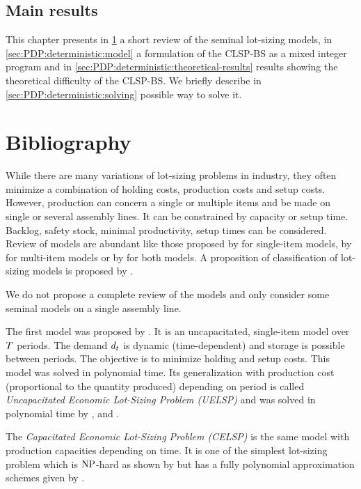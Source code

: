 \subsection{Main results}
\label{sec:PDP:deterministic:introduction:main-results}


This chapter presents in \cref{sec:PDP:deterministic:bibliography} a short review of the seminal lot-sizing models, in \cref{sec:PDP:deterministic:model} a formulation of the CLSP-BS as a mixed integer program and in \cref{sec:PDP:deterministic:theoretical-results} results showing the theoretical difficulty of the CLSP-BS.
We briefly describe in \cref{sec:PDP:deterministic:solving} possible way to solve it.



\section{Bibliography}
\label{sec:PDP:deterministic:bibliography}

While there are many variations of lot-sizing problems in industry, they often minimize a combination of holding costs, production costs and setup costs.
However, production can concern a single or multiple items and be made on single or several assembly lines.
It can be constrained by capacity or setup time.
Backlog, safety stock, minimal productivity, setup times can be considered.
Review of models are abundant like those proposed by \citet{Geunes2014} for single-item models, by \citet{Gicquel2008} for multi-item models or by \citet{Karimi2003} for both models.
A proposition of classification of lot-sizing models is proposed by \citet[Chapter 4 and 12]{Pochet2006}.

We do not propose a complete review of the models and only consider some seminal models on a single assembly line.

\medskip

The first model was proposed by \citet{Wagner1958}.
It is an uncapacitated, single-item model over $T$ periods.
The demand $d_t$ is dynamic (\ie time-dependent) and storage is possible between periods.
The objective is to minimize holding and setup costs.
This model was solved in polynomial time.
Its generalization with production cost (proportional to the quantity produced) depending on period is called \emph{Uncapacitated Economic Lot-Sizing Problem (UELSP)} and was solved in polynomial time by \citet{Federgruen1991}, \citet{Wagelmans1992} and \citet{Aggarwal1993}.


The \emph{Capacitated Economic Lot-Sizing Problem (CELSP)} is the same model with production capacities depending on time.
It is one of the simplest lot-sizing problem which is $\operatorname{NP}$-hard as shown by \citet{Florian1980} but has a fully polynomial approximation schemes given by \citet{vanHoesel2001}.

